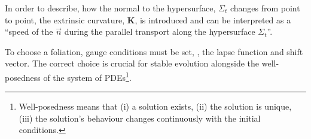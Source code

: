 
In order to describe, how the normal to the hypersurface, $\Sigma_t$ changes 
from point to point, the extrinsic curvature, $\boldsymbol{K}$, is introduced 
%
and can be interpreted as a ``speed of the $\vec{n}$ during the parallel 
transport along the hypersurface $\Sigma_t$''. 



To choose a foliation, gauge conditions must be set, \ie, the 
lapse function and shift vector. 
The correct choice is crucial for stable evolution 
\citep{Alcubierre:2002kk}
alongside the well-posedness of the system of \acp{PDE}\footnote{
    Well-posedness means that (i) a solution exists, (ii) the solution is unique,
    (iii) the solution's behaviour changes continuously with the initial conditions.
}.
%

